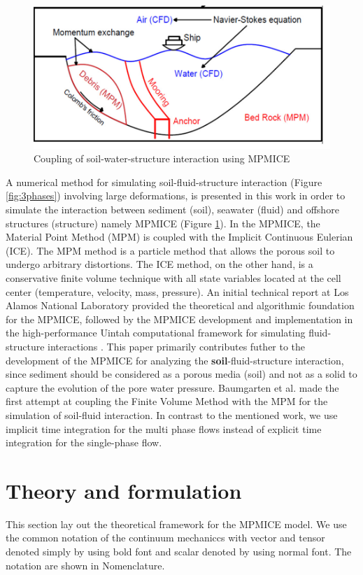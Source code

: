 \documentclass[preprint,12pt]{elsarticle}
\begin{document}
%
%
\begin{figure}[h]
\center
\includegraphics[scale=.4]{MPMICE.jpg}
\caption{Coupling of soil-water-structure interaction using MPMICE}
\label{fig:MPMICE}
\end {figure}
%
%

A numerical method for simulating soil-fluid-structure interaction (Figure \ref{fig:3phases}) involving large deformations, is presented in this work in order to simulate the interaction between sediment (soil), seawater (fluid) and offshore structures (structure) namely MPMICE (Figure \ref{fig:MPMICE}). In the MPMICE, the Material Point Method (MPM) is coupled with the Implicit Continuous Eulerian (ICE). The MPM method is a particle method that allows the porous soil to undergo arbitrary distortions. The ICE method, on the other hand, is a conservative finite volume technique with all state variables located at the cell center (temperature, velocity, mass, pressure). An initial technical report \cite{Kashiwa} at Los Alamos National Laboratory provided the theoretical and algorithmic foundation for the MPMICE, followed by the MPMICE development and implementation in the high-performance Uintah computational framework for simulating fluid-structure interactions \cite{MPMICE}. This paper primarily contributes futher to the development of the MPMICE for analyzing the \textbf{soil}-fluid-structure interaction, since sediment should be considered as a porous media (soil) and not as a solid to capture the evolution of the pore water pressure. Baumgarten et al. \cite{Baumgarten2021} made the first attempt at coupling the Finite Volume Method with the MPM for the simulation of soil-fluid interaction. In contrast to the mentioned work, we use implicit time integration for the multi phase flows instead of explicit time integration for the single-phase flow.

\section{\textsf{Theory and formulation}}
This section lay out the theoretical framework for the MPMICE model. We use the common notation of the continuum mechaniccs with vector and tensor denoted simply by using bold font and scalar denoted by using normal font. The notation are shown in Nomenclature.
\end{document}
